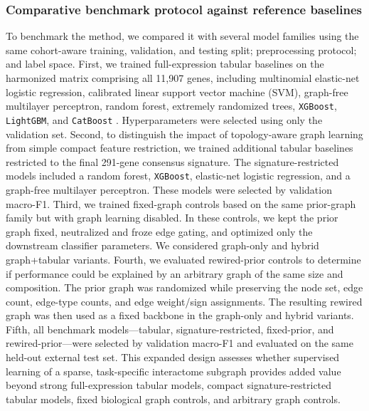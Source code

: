 \documentclass[unnumsec,webpdf,modern,large]{oup-authoring-template}
\begin{document}
\subsubsection{Comparative benchmark protocol against reference baselines}
To benchmark the method, we compared it with several model families using the same cohort-aware training, validation, and testing split; preprocessing protocol; and label space. First, we trained full-expression tabular baselines on the harmonized matrix comprising all 11,907 genes, including multinomial elastic-net logistic regression, calibrated linear support vector machine (SVM), graph-free multilayer perceptron, random forest, extremely randomized trees, \texttt{XGBoost}, \texttt{LightGBM}, and \texttt{CatBoost} \citep{Ke2017LightGBM,Prokhorenkova2018CatBoost}. Hyperparameters were selected using only the validation set. Second, to distinguish the impact of topology-aware graph learning from simple compact feature restriction, we trained additional tabular baselines restricted to the final 291-gene consensus signature. The signature-restricted models included a random forest, \texttt{XGBoost}, elastic-net logistic regression, and a graph-free multilayer perceptron. These models were selected by validation macro-F1. Third, we trained fixed-graph controls based on the same prior-graph family but with graph learning disabled. In these controls, we kept the prior graph fixed, neutralized and froze edge gating, and optimized only the downstream classifier parameters. We considered graph-only and hybrid graph+tabular variants. Fourth, we evaluated rewired-prior controls to determine if performance could be explained by an arbitrary graph of the same size and composition. The prior graph was randomized while preserving the node set, edge count, edge-type counts, and edge weight/sign assignments. The resulting rewired graph was then used as a fixed backbone in the graph-only and hybrid variants. Fifth, all benchmark models---tabular, signature-restricted, fixed-prior, and rewired-prior---were selected by validation macro-F1 and evaluated on the same held-out external test set. This expanded design assesses whether supervised learning of a sparse, task-specific interactome subgraph provides added value beyond strong full-expression tabular models, compact signature-restricted tabular models, fixed biological graph controls, and arbitrary graph controls.
\end{document}
